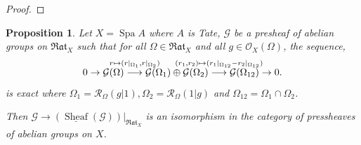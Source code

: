 \documentclass[8pt]{article}
\numberwithin{equation}{section}
\newtheorem{proposition}{Proposition}[subsection]
\DeclareMathOperator{\Spa}{Spa}
\DeclareMathOperator{\Sheaf}{Sheaf}
\newcommand{\cR}[0]{\mathcal{R}}
\newcommand{\ab}[1]{\vert #1 \vert}
\newcommand{\Rat}[0]{\mathfrak{Rat}}
\begin{document}
\begin{proof}
\end{proof}

\begin{proposition}
    \label{proposition_24_6}
    Let $X=\Spa A$ where $A$ is Tate, $\mathcal{G}$ be a presheaf of abelian groups on $\Rat_X$ such that for all $\Omega\in\Rat_X$ and all $g\in\mathcal{O}_X(\Omega)$, the sequence,
    \begin{equation*}
        0\to\mathcal{G}(\Omega)\stackrel{\substack{\mathmakebox[0pt][c]{r\mapsto(r|_{\Omega_1},r|_{\Omega_2})}\\\:}}{\longrightarrow}\mathcal{G}(\Omega_1)\oplus\mathcal{G}(\Omega_2)\stackrel{\substack{\mathmakebox[0pt][c]{(r_1,r_2)\mapsto(r_1|_{\Omega_{12}}-r_2|_{\Omega_{12}})}\\\:}}{\longrightarrow}\mathcal{G}(\Omega_{12})\to0.
    \end{equation*}
    is exact where $\Omega_1 = \cR_\Omega(g|1),\Omega_2 = \cR_\Omega(1|g)$ and $\Omega_{12} = \Omega_1\cap \Omega_2$. 
    \par Then $\mathcal{G}\to(\underline{\Sheaf}(\mathcal{G}))|_{\Rat_X}$ is an isomorphism in the category of pressheaves of abelian groups on $X$.
\end{proposition}
\end{document}
